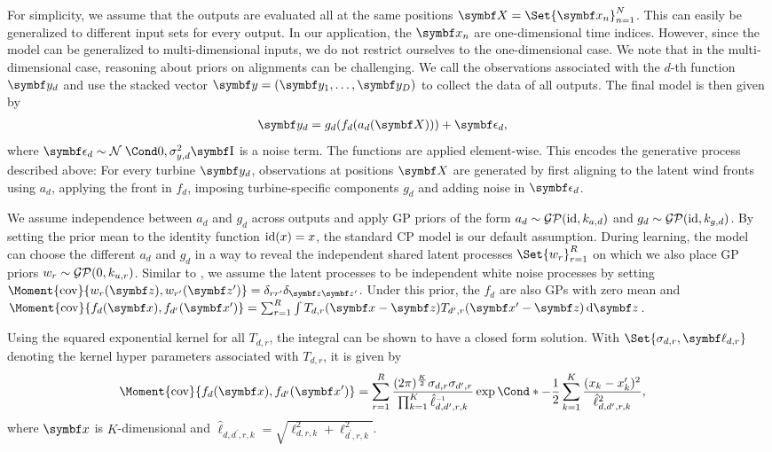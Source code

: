 For simplicity, we assume that the outputs are evaluated all at the same positions $\mat{X} = \Set{\mat{x_n}}_{n=1}^N$.
This can easily be generalized to different input sets for every output.
In our application, the $\mat{x_n}$ are one-dimensional time indices.
However, since the model can be generalized to multi-dimensional inputs, we do not restrict ourselves to the one-dimensional case.
We note that in the multi-dimensional case, reasoning about priors on alignments can be challenging.
We call the observations associated with the $d$-th function $\mat{y_d}$ and use the stacked vector $\mat{y} = \left( \mat{y_1}, \dots, \mat{y_D} \right)$ to collect the data of all outputs.
The final model is then given by
\begin{align}
    \mat{y_d} & = g_d(f_d(a_d(\mat{X}))) + \mat{\epsilon_d},
\end{align}
where $\mat{\epsilon_d} \sim \Gaussian{0, \sigma_{y, d}^2\Eye}$ is a noise term.
The functions are applied element-wise.
This encodes the generative process described above:
For every turbine $\rv{y_d}$, observations at positions $\rv{X}$ are generated by first aligning to the latent wind fronts using $a_d$, applying the front in $f_d$, imposing turbine-specific components $g_d$ and adding noise in $\rv{\epsilon_d}$.

We assume independence between $a_d$ and $g_d$ across outputs and apply GP priors of the form $a_d \sim \operatorname{\mathcal{GP}}(\operatorname{id}, k_{a, d})$ and $g_d \sim \operatorname{\mathcal{GP}}(\operatorname{id}, k_{g, d})$.
By setting the prior mean to the identity function $\operatorname{id}(x) = x$, the standard CP model is our default assumption.
During learning, the model can choose the different $a_d$ and $g_d$ in a way to reveal the independent shared latent processes $\Set{w_r}_{r=1}^R$ on which we also place GP priors $w_r \sim \operatorname{\mathcal{GP}}(0, k_{u, r})$.
Similar to \textcite{boyle_dependent_2004}, we assume the latent processes to be independent white noise processes by setting $\Moment{\cov}{w_r(\mat{z}), w_{r^\prime}(\mat{z^\prime})} = \delta_{rr^\prime}\delta_{\mat{z}\mat{z^\prime}}$.
Under this prior, the $f_d$ are also GPs with zero mean and $\Moment{\cov}{f_d(\mat{x}), f_{d^\prime}(\mat{x^\prime})} = \sum_{r=1}^R \int T_{d,r}(\mat{x} - \mat{z}) T_{d^\prime,r}(\mat{x^\prime} - \mat{z}) \diff \mat{z}$.

Using the squared exponential kernel for all $T_{d, r}$, the integral can be shown to have a closed form solution.
With $\Set{\sigma_{d,r}, \mat{\ell_{d, r}}}$ denoting the kernel hyper parameters associated with $T_{d,r}$, it is given by
\begin{align}
    \label{eq:timeseries_alignment:dependent_kernel}
    \begin{split}
        \MoveEqLeft[1] \Moment{\cov}{f_d(\mat{x}), f_{d^\prime}(\mat{x^\prime})} = \sum_{r=1}^R \frac{(2\pi)^{\frac{K}{2}}\sigma_{d, r}\sigma_{d^\prime, r}}{\prod_{k=1}^K \hat{\ell}_{d, d^\prime, r, k}\inv} \Fun*{\exp}{-\frac{1}{2} \sum_{k=1}^K \frac{(x_k - x^\prime_k)^2}{\hat{\ell}_{d, d^\prime, r, k}^2}},
    \end{split}
\end{align}
where $\mat{x}$ is $K$-dimensional and $\hat{\ell}_{d, d^\prime, r, k} = \sqrt{\ell_{d, r, k}^2 + \ell_{d^\prime, r, k}^2}$.


